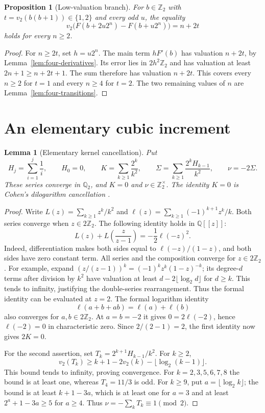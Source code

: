 \documentclass[11pt]{article}
\newtheorem{lemma}[theorem]{Lemma}
\newtheorem{proposition}[theorem]{Proposition}
\theoremstyle{remark}\newtheorem{remark}[theorem]{Remark}
\newcommand{\Ztwo}{\mathbb Z_2}\newcommand{\Qtwo}{\mathbb Q_2}
\begin{document}
\begin{proposition}[Low-valuation branch]\label{prop:low-eight-checks}
For $b\in\Ztwo$ with $t=v_2(b(b+1))\in\{1,2\}$ and every odd $u$, the equality
\[
v_2\bigl(F(b+2u2^n)-F(b+u2^n)\bigr)=n+2t
\]
holds for every $n\ge2$.
\end{proposition}
\begin{proof}
For $n\ge2t$, set $h=u2^n$. The main term $hF'(b)$ has valuation
$n+2t$, by Lemma~\ref{lem:four-derivatives}. Its error lies in
$2h^2\mathbb Z_2$ and has valuation at least $2n+1\ge n+2t+1$.
The sum therefore has valuation $n+2t$. This covers every $n\ge2$ for
$t=1$ and every $n\ge4$ for $t=2$. The two remaining values of $n$ are
Lemma~\ref{lem:four-transitions}.
\end{proof}

\section{An elementary cubic increment}

\begin{lemma}[Elementary kernel cancellation]\label{lem:elementary-kernels}
Put
\[
 H_j=\sum_{i=1}^j\frac1i,\qquad H_0=0,\qquad
 K=\sum_{k\ge1}\frac{2^k}{k^2},\qquad
 \Sigma=\sum_{k\ge1}\frac{2^kH_{k-1}}{k^2},\qquad\nu=-2\Sigma.
\]
These series converge in $\mathbb Q_2$, and
$K=0$ and $\nu\in\mathbb Z_2^\times$. The identity $K=0$ is
Cohen's dilogarithm cancellation \cite[Lemma~3]{Cohen1999}.
\end{lemma}
\begin{proof}
Write
$L(z)=\sum_{k\ge1}z^k/k^2$ and
$\ell(z)=\sum_{k\ge1}(-1)^{k+1}z^k/k$.
Both series converge when $z\in2\mathbb Z_2$.
The following identity holds in $\mathbb Q[[z]]$:
\[
 L(z)+L\left(\frac{z}{z-1}\right)
 =-\frac12\ell(-z)^2.
\]
Indeed, differentiation makes both sides equal to
$\ell(-z)/(1-z)$, and both sides have zero constant term.
All series and the composition converge for $z\in2\mathbb Z_2$.
For example, expand $(z/(z-1))^k=(-1)^kz^k(1-z)^{-k}$;
its degree-$d$ terms after division by $k^2$ have valuation at least
$d-2\lfloor\log_2d\rfloor$ for $d\ge k$.
This tends to infinity, justifying the double-series rearrangement.
Thus the formal identity can be evaluated at $z=2$.
The formal logarithm identity
\[
 \ell(a+b+ab)=\ell(a)+\ell(b)
\]
also converges for $a,b\in2\mathbb Z_2$.  At $a=b=-2$ it gives
$0=2\ell(-2)$, hence $\ell(-2)=0$ in characteristic zero.
Since $2/(2-1)=2$, the first identity now gives $2K=0$.

For the second assertion, set
$T_k=2^{k+1}H_{k-1}/k^2$.
For $k\ge2$,
\[
 v_2(T_k)\ge k+1-2v_2(k)-\lfloor\log_2(k-1)\rfloor.
\]
This bound tends to infinity, proving convergence.
For $k=2,3,5,6,7,8$ the bound is at least one, whereas
$T_4=11/3$ is odd.  For $k\ge9$, put
$a=\lfloor\log_2 k\rfloor$; the bound is at least $k+1-3a$,
which is at least one for $a=3$ and at least
$2^a+1-3a\ge5$ for $a\ge4$.
Thus $\nu=-\sum_kT_k\equiv1\pmod2$.
\end{proof}
\end{document}
